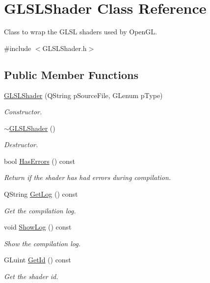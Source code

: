 \hypertarget{class_g_l_s_l_shader}{\section{G\+L\+S\+L\+Shader Class Reference}
\label{class_g_l_s_l_shader}
}


Class to wrap the G\+L\+S\+L shaders used by Open\+G\+L.  




{\ttfamily \#include $<$G\+L\+S\+L\+Shader.\+h$>$}

\subsection*{Public Member Functions}
\begin{DoxyCompactItemize}
\item 
\hyperlink{class_g_l_s_l_shader_a7a567ce5e28a03fd983014539f3d4292}{G\+L\+S\+L\+Shader} (Q\+String p\+Source\+File, G\+Lenum p\+Type)
\begin{DoxyCompactList}\small\item\em Constructor. \end{DoxyCompactList}\item 
\hyperlink{class_g_l_s_l_shader_a5e53dfa871c7b870fb8eb4734371ec73}{$\sim$\+G\+L\+S\+L\+Shader} ()
\begin{DoxyCompactList}\small\item\em Destructor. \end{DoxyCompactList}\item 
bool \hyperlink{class_g_l_s_l_shader_aed8ccd518a70a98065d146dfc8c64171}{Has\+Errors} () const 
\begin{DoxyCompactList}\small\item\em Return if the shader has had errors during compilation. \end{DoxyCompactList}\item 
Q\+String \hyperlink{class_g_l_s_l_shader_a4d7be187736e1ead154e6837803f0de0}{Get\+Log} () const 
\begin{DoxyCompactList}\small\item\em Get the compilation log. \end{DoxyCompactList}\item 
void \hyperlink{class_g_l_s_l_shader_af0f91cbc0ec19068d5c1a2003ae9119a}{Show\+Log} () const 
\begin{DoxyCompactList}\small\item\em Show the compilation log. \end{DoxyCompactList}\item 
G\+Luint \hyperlink{class_g_l_s_l_shader_ad7c28f634e2627356d9b2a0b47ca74de}{Get\+Id} () const 
\begin{DoxyCompactList}\small\item\em Get the shader id. \end{DoxyCompactList}\end{DoxyCompactItemize}
